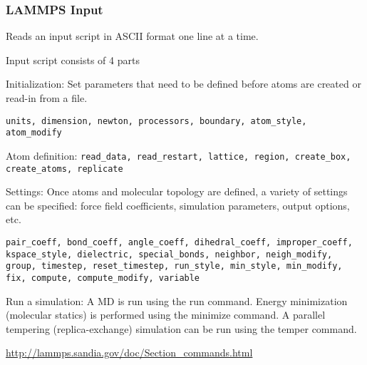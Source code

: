\documentclass[slidestop,mathserif,compress,xcolor=svgnames]{beamer}
\begin{document}
\begin{frame}
  \frametitle{\footnotesize LAMMPS Input}
  \begin{itemize}
    {\scriptsize
    \item Reads an input script in ASCII format one line at a time.
    \item Input script consists of 4 parts
    \begin{enumerate}
      {\scriptsize
      \item Initialization: Set parameters that need to be defined before atoms are created or read-in from a file.
      \item[] \texttt{units, dimension, newton, processors, boundary, atom\_style, atom\_modify}
      \item Atom definition: \texttt{read\_data, read\_restart, lattice, region, create\_box, create\_atoms, replicate}
      \item Settings: Once atoms and molecular topology are defined, a variety of settings can be specified: force field coefficients, simulation parameters, output options, etc. 
      \item[] \texttt{pair\_coeff, bond\_coeff, angle\_coeff, dihedral\_coeff, improper\_coeff, kspace\_style, dielectric, special\_bonds, neighbor, neigh\_modify, group, timestep, reset\_timestep, run\_style, min\_style, min\_modify, fix, compute, compute\_modify, variable}
      \item Run a simulation: A MD is run using the run command. Energy minimization (molecular statics) is performed using the minimize command. A parallel tempering (replica-exchange) simulation can be run using the temper command.
      }
    \end{enumerate}
    \item \url{http://lammps.sandia.gov/doc/Section_commands.html}
    }
  \end{itemize}
\end{frame}
\end{document}
